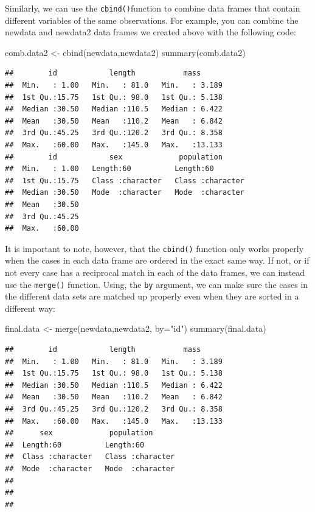 \documentclass[
]{book}
\newenvironment{Shaded}{\begin{snugshade}}{\end{snugshade}}
\newcommand{\AttributeTok}[1]{\textcolor[rgb]{0.77,0.63,0.00}{#1}}
\newcommand{\FunctionTok}[1]{\textcolor[rgb]{0.00,0.00,0.00}{#1}}
\newcommand{\NormalTok}[1]{#1}
\newcommand{\OtherTok}[1]{\textcolor[rgb]{0.56,0.35,0.01}{#1}}
\newcommand{\StringTok}[1]{\textcolor[rgb]{0.31,0.60,0.02}{#1}}
\begin{document}
Similarly, we can use the \texttt{cbind()}function to combine data frames that contain different variables of the same observations. For example, you can combine the newdata and newdata2 data frames we created above with the following code:

\begin{Shaded}
\begin{Highlighting}[]
\NormalTok{comb.data2 }\OtherTok{\textless{}{-}} \FunctionTok{cbind}\NormalTok{(newdata,newdata2)}
\FunctionTok{summary}\NormalTok{(comb.data2)}
\end{Highlighting}
\end{Shaded}

\begin{verbatim}
##        id            length           mass       
##  Min.   : 1.00   Min.   : 81.0   Min.   : 3.189  
##  1st Qu.:15.75   1st Qu.: 98.0   1st Qu.: 5.138  
##  Median :30.50   Median :110.5   Median : 6.422  
##  Mean   :30.50   Mean   :110.2   Mean   : 6.842  
##  3rd Qu.:45.25   3rd Qu.:120.2   3rd Qu.: 8.358  
##  Max.   :60.00   Max.   :145.0   Max.   :13.133  
##        id            sex             population       
##  Min.   : 1.00   Length:60          Length:60         
##  1st Qu.:15.75   Class :character   Class :character  
##  Median :30.50   Mode  :character   Mode  :character  
##  Mean   :30.50                                        
##  3rd Qu.:45.25                                        
##  Max.   :60.00
\end{verbatim}

It is important to note, however, that the \texttt{cbind()} function only works properly when the cases in each data frame are ordered in the exact same way. If not, or if not every case has a reciprocal match in each of the data frames, we can instead use the \texttt{merge()} function. Using, the \texttt{by} argument, we can make sure the cases in the different data sets are matched up properly even when they are sorted in a different way:

\begin{Shaded}
\begin{Highlighting}[]
\NormalTok{final.data }\OtherTok{\textless{}{-}} \FunctionTok{merge}\NormalTok{(newdata,newdata2, }\AttributeTok{by=}\StringTok{"id"}\NormalTok{)}
\FunctionTok{summary}\NormalTok{(final.data)}
\end{Highlighting}
\end{Shaded}

\begin{verbatim}
##        id            length           mass       
##  Min.   : 1.00   Min.   : 81.0   Min.   : 3.189  
##  1st Qu.:15.75   1st Qu.: 98.0   1st Qu.: 5.138  
##  Median :30.50   Median :110.5   Median : 6.422  
##  Mean   :30.50   Mean   :110.2   Mean   : 6.842  
##  3rd Qu.:45.25   3rd Qu.:120.2   3rd Qu.: 8.358  
##  Max.   :60.00   Max.   :145.0   Max.   :13.133  
##      sex             population       
##  Length:60          Length:60         
##  Class :character   Class :character  
##  Mode  :character   Mode  :character  
##                                       
##                                       
## 
\end{verbatim}
\end{document}
